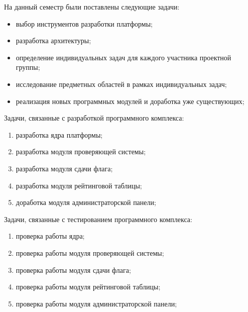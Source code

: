 На данный семестр были поставлены следующие задачи:

\begin{itemize}
\item выбор инструментов разработки платформы;
\item разработка архитектуры;
\item определение индивидуальных задач для каждого участника проектной группы;
\item исследование предметных областей в рамках индивидуальных задач;
\item реализация новых программных модулей и доработка уже существующих;
\end{itemize}

Задачи, связанные с разработкой программного комплекса:

\begin{enumerate}
\item разработка ядра платформы;
\item разработка модуля проверяющей системы;
\item разработка модуля сдачи флага;
\item разработка модуля рейтинговой таблицы;
\item доработка модуля администраторской панели;
\end{enumerate}

Задачи, связанные с тестированием программного комплекса:

\begin{enumerate}
\item проверка работы ядра;
\item проверка работы модуля проверяющей системы;
\item проверка работы модуля сдачи флага;
\item проверка работы модуля рейтинговой таблицы;
\item проверка работы модуля администраторской панели;
\end{enumerate}
